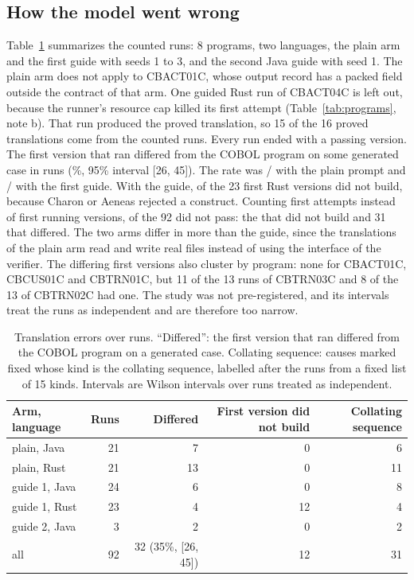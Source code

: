 \subsection{How the model went wrong}

Table~\ref{tab:errors} summarizes the \aaRuns{} counted runs: 8 programs, two languages, the plain arm and the first
guide with seeds 1 to 3, and the second Java guide with seed 1. The plain arm does not apply to CBACT01C, whose
output record has a packed field outside the contract of that arm. One guided Rust run of CBACT04C is left out, because the runner's resource cap killed its first attempt
(Table~\ref{tab:programs}, note b). That run produced the proved translation, so 15 of the 16 proved translations
come from the counted runs. Every run ended with a
passing version. The first version that ran differed from the COBOL program
on some generated case in \aaFirstDiff{} runs (\aaFirstDiffPct\%, 95\% interval [26, 45]). The rate was
\aaPlainDiff{}/\aaPlainN{} with the plain prompt and \aaGuideDiff{}/\aaGuideN{} with the first guide. With the guide,
\aaBuildFail{} of the 23 first Rust versions did not build, because Charon or Aeneas rejected a construct. Counting
first attempts instead of first running versions, \aaNotPass{} of the 92 did not pass: the \aaBuildFail{} that did not
build and 31 that differed. The two arms differ in more than the guide, since the translations of the plain arm read
and write real files instead of using the interface of the verifier. The differing first versions also cluster by
program: none for CBACT01C, CBCUS01C and CBTRN01C, but 11 of the 13 runs of CBTRN03C and 8 of the 13 of CBTRN02C had one.
The study was not pre-registered, and its intervals treat the runs as independent and are therefore too narrow.

\begin{table}
\caption{Translation errors over \aaRuns{} runs. ``Differed'': the first version that ran differed from the COBOL
program on a generated case. Collating sequence: causes marked fixed whose kind is the collating sequence, labelled after the runs from a fixed
list of 15 kinds. Intervals are Wilson intervals over runs treated as independent.}
\label{tab:errors}
\small
\begin{tabular}{lrrrr}
\toprule
Arm, language & Runs & Differed & First version did not build & Collating sequence \\
\midrule
plain, Java & 21 & 7 & 0 & 6 \\
plain, Rust & 21 & 13 & 0 & 11 \\
guide 1, Java & 24 & 6 & 0 & 8 \\
guide 1, Rust & 23 & 4 & 12 & 4 \\
guide 2, Java & 3 & 2 & 0 & 2 \\
\midrule
all & 92 & 32 (35\%, [26, 45]) & 12 & 31 \\
\bottomrule
\end{tabular}
\end{table}

